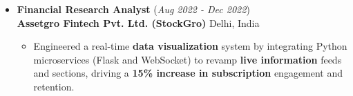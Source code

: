 \documentclass[10pt]{extarticle}
\begin{document}
\begin{itemize}
    \begin{itemize}
        \item Conducted end-to-end analysis on hotel booking data, performing EDA and building 10+ ML models (Logistic Regression to LGBM, XGBoost, ANN) to accurately predict cancellations, uncover key booking trends and evaluate model performance.
    \end{itemize}
    \vspace{5pt}
    \item \textbf{Financial Research Analyst} \hfill (\textit{Aug 2022 - Dec 2022})\\
    \textbf{Assetgro Fintech Pvt. Ltd. (StockGro)} \hfill Delhi, India
    \begin{itemize}
        \item Engineered a real-time \textbf{data visualization} system by integrating Python microservices (Flask and WebSocket) to revamp \textbf{live information} feeds and sections, driving a \textbf{15\% increase in subscription} engagement and retention.\vspace{2pt}

\end{itemize}
\end{itemize}
\end{document}
